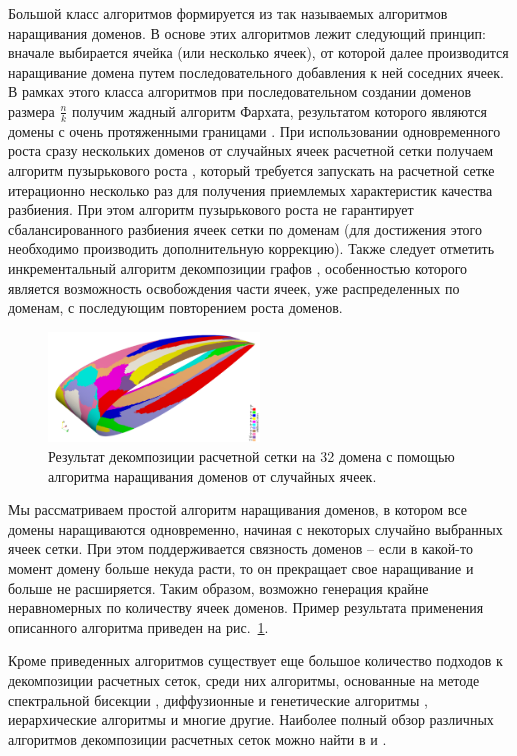 Большой класс алгоритмов формируется из так называемых алгоритмов наращивания доменов.
В основе этих алгоритмов лежит следующий принцип: вначале выбирается ячейка (или несколько ячеек), от которой далее производится наращивание домена путем последовательного добавления к ней соседних ячеек.
В рамках этого класса алгоритмов при последовательном создании доменов размера $\frac{n}{k}$ получим жадный алгоритм Фархата, результатом которого являются домены с очень протяженными границами \cite{Farhat1988Decomp}.
При использовании одновременного роста сразу нескольких доменов от случайных ячеек расчетной сетки получаем алгоритм пузырькового роста \cite{Preis1997Decomp}, который требуется запускать на расчетной сетке итерационно несколько раз для получения приемлемых характеристик качества разбиения.
При этом алгоритм пузырькового роста не гарантирует сбалансированного разбиения ячеек сетки по доменам (для достижения этого необходимо производить дополнительную коррекцию).
Также следует отметить инкрементальный алгоритм декомпозиции графов \cite{Yakobovsky2005Decomp}, особенностью которого является возможность освобождения части ячеек, уже распределенных по доменам, с последующим повторением роста доменов.

\begin{figure}[ht]
	\centering
	\includegraphics[width=0.5\textwidth]{./pics/text_2_decompsurf/wing_rgrow_32.png}
	\caption{Результат декомпозиции расчетной сетки на 32 домена с помощью алгоритма наращивания доменов от случайных ячеек.}
	\label{fig:text_2_decompsurf_wing_rgrow_32}
\end{figure}

Мы рассматриваем простой алгоритм наращивания доменов, в котором все домены наращиваются одновременно, начиная с некоторых случайно выбранных ячеек сетки.
При этом поддерживается связность доменов -- если в какой-то момент домену больше некуда расти, то он прекращает свое наращивание и больше не расширяется.
Таким образом, возможно генерация крайне неравномерных по количеству ячеек доменов. Пример результата применения описанного алгоритма приведен на рис.~\ref{fig:text_2_decompsurf_wing_rgrow_32}.

Кроме приведенных алгоритмов существует еще большое количество подходов к декомпозиции расчетных сеток, среди них алгоритмы, основанные на методе спектральной бисекции \cite{Urschel2014Decomp}, диффузионные и генетические алгоритмы \cite{Zhao2019Decomp}, иерархические алгоритмы \cite{Kapyris1998Decomp} и многие другие.
Наиболее полный обзор различных алгоритмов декомпозиции расчетных сеток можно найти в \cite{Golovchenko2020Decomp} и \cite{Zheleznyakova2017Decomp}.

